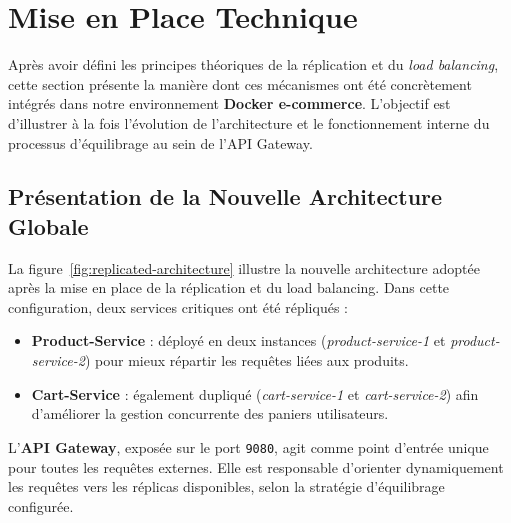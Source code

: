 \section{Mise en Place Technique}
Après avoir défini les principes théoriques de la réplication et du \textit{load balancing}, cette section présente la manière dont ces mécanismes ont été concrètement intégrés dans notre environnement \textbf{Docker e-commerce}.  
L'objectif est d'illustrer à la fois l'évolution de l'architecture et le fonctionnement interne du processus d'équilibrage au sein de l'API Gateway.

\subsection{Présentation de la Nouvelle Architecture Globale}
La figure~\ref{fig:replicated-architecture} illustre la nouvelle architecture adoptée après la mise en place de la réplication et du load balancing.  
Dans cette configuration, deux services critiques ont été répliqués :
\begin{itemize}
    \item \textbf{Product-Service} : déployé en deux instances (\textit{product-service-1} et \textit{product-service-2}) pour mieux répartir les requêtes liées aux produits.
    \item \textbf{Cart-Service} : également dupliqué (\textit{cart-service-1} et \textit{cart-service-2}) afin d'améliorer la gestion concurrente des paniers utilisateurs.
\end{itemize}

L'\textbf{API Gateway}, exposée sur le port \texttt{9080}, agit comme point d'entrée unique pour toutes les requêtes externes. Elle est responsable d'orienter dynamiquement les requêtes vers les réplicas disponibles, selon la stratégie d'équilibrage configurée.

